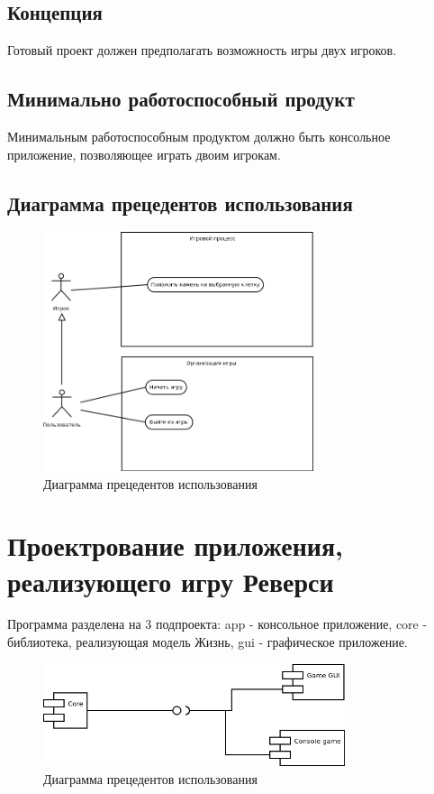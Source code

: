 \documentclass[a4paper]{article}
\begin{document}
\subsection{Концепция}
Готовый проект должен предполагать возможность игры двух игроков. 

\subsection{Минимально работоспособный продукт}
Минимальным работоспособным продуктом должно быть консольное приложение, позволяющее играть двоим игрокам.


\subsection{Диаграмма прецедентов использования}

\begin{figure}[H]
	\begin{center}
		\includegraphics[scale=0.4, height=7cm]{Diagrams/Diagram1}
		\caption{Диаграмма прецедентов использования} 
		\label{pic:Diagram1} %
	\end{center}
\end{figure}

\section{Проектрование приложения, реализующего игру Реверси}
Программа разделена на 3 подпроекта: app - консольное приложение, core - библиотека, реализующая модель Жизнь, gui - графическое приложение.

\begin{figure}[H]
	\begin{center}
		\includegraphics[scale=0.4, height=3cm]{Diagrams/Diagram2}
		\caption{Диаграмма прецедентов использования} 
		\label{pic:Diagram2} %
	\end{center}
\end{figure}
\end{document}
